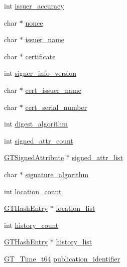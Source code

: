 \begin{DoxyCompactItemize}
\item 
int \hyperlink{struct_g_t_time_stamp_explicit__st_a58fc0e0cf97e36dbbc57923840d115a1}{issuer\_\-accuracy}
\item 
char $\ast$ \hyperlink{struct_g_t_time_stamp_explicit__st_a135e613097d30c78572a836d486268be}{nonce}
\item 
char $\ast$ \hyperlink{struct_g_t_time_stamp_explicit__st_a3db712f6cf2bc478b244de8214070fe0}{issuer\_\-name}
\item 
char $\ast$ \hyperlink{struct_g_t_time_stamp_explicit__st_a92d1a99352583d50e5866c8c69e29722}{certificate}
\item 
int \hyperlink{struct_g_t_time_stamp_explicit__st_a2c8418adfe52de52a85f393448ec4fd2}{signer\_\-info\_\-version}
\item 
char $\ast$ \hyperlink{struct_g_t_time_stamp_explicit__st_a6158598fa0be81537cf54a94c1b20723}{cert\_\-issuer\_\-name}
\item 
char $\ast$ \hyperlink{struct_g_t_time_stamp_explicit__st_a383a82a36c0ae2b9978a70563cf1d037}{cert\_\-serial\_\-number}
\item 
int \hyperlink{struct_g_t_time_stamp_explicit__st_a97614607045d391e6d58c3daa31c8538}{digest\_\-algorithm}
\item 
int \hyperlink{struct_g_t_time_stamp_explicit__st_a7fc4a621668932cbdf55171908604683}{signed\_\-attr\_\-count}
\item 
\hyperlink{struct_g_t_signed_attribute__st}{GTSignedAttribute} $\ast$ \hyperlink{struct_g_t_time_stamp_explicit__st_aa0655469149117409308f6f4fb361c94}{signed\_\-attr\_\-list}
\item 
char $\ast$ \hyperlink{struct_g_t_time_stamp_explicit__st_a451e9a914910c7f64533558276b2e601}{signature\_\-algorithm}
\item 
int \hyperlink{struct_g_t_time_stamp_explicit__st_ae9f5e750ed9cd31ec89177f72eb4d84e}{location\_\-count}
\item 
\hyperlink{struct_g_t_hash_entry__st}{GTHashEntry} $\ast$ \hyperlink{struct_g_t_time_stamp_explicit__st_a668518840475a7feec8f0391bcc26cad}{location\_\-list}
\item 
int \hyperlink{struct_g_t_time_stamp_explicit__st_adce3816eed0492b7ad965a7749d51ef1}{history\_\-count}
\item 
\hyperlink{struct_g_t_hash_entry__st}{GTHashEntry} $\ast$ \hyperlink{struct_g_t_time_stamp_explicit__st_afe631a5415e03342c5381923f5772c7f}{history\_\-list}
\item 
\hyperlink{group__common_ga4cc54826c21e0ed438d8e35be7039328}{GT\_\-Time\_\-t64} \hyperlink{struct_g_t_time_stamp_explicit__st_a99428914cd47f90062a204f6578abcd5}{publication\_\-identifier}

\end{DoxyCompactItemize}
